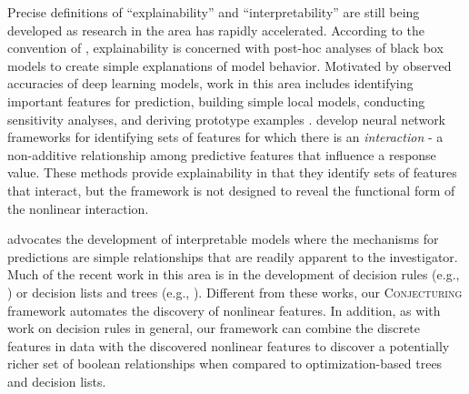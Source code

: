 \documentclass[ijds,nonblindrev]{informs-ijds}
\begin{document}

Precise definitions of ``explainability'' and ``interpretability'' are still being developed \citep{Vilone20, Lee20, Furnkranz20} as research in the area has rapidly accelerated.  According to the convention of \cite{Rudin19}, explainability is concerned with post-hoc analyses of black box models to create simple explanations of model behavior.  Motivated by observed accuracies of deep learning models, work in this area includes identifying important features for prediction, building simple local models, conducting sensitivity analyses, and deriving prototype examples \citep{SamekMuller19, Elton20}. 
\citet{tsang:18, tsang2:18, tsang:20} develop neural network frameworks for identifying sets of features for which there is an {\it interaction} - a non-additive relationship among predictive features that influence a response value.  These methods provide explainability in that they identify sets of features that interact, but the framework is not designed to reveal the functional form of the nonlinear interaction.

\cite{Rudin19} advocates the development of interpretable models where the mechanisms for predictions are simple relationships that are readily apparent to the investigator.  Much of the recent work in this area is in the development of decision rules (e.g., \citep{hammer:06, dash:18, gottlob:21}) or decision lists and trees (e.g., \citep{wang:15, WangRudin17, RudinErtekin18, bertsimas:17, verwer:19, blanquero:21, aghaei:21, akyuz:21}).   Different from these works, our \textsc{Conjecturing} framework automates the discovery of nonlinear features.  In addition, as with work on decision rules in general, our framework can combine the discrete features in data with the discovered nonlinear features to discover a potentially richer set of boolean relationships when compared to optimization-based trees and decision lists.   





\end{document}
